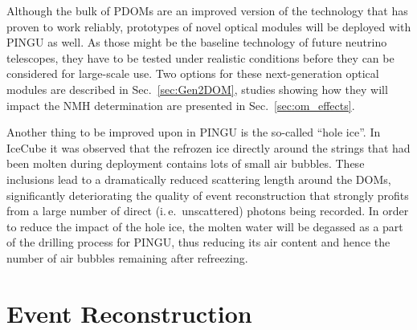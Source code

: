 Although the bulk of PDOMs are an improved version of the technology that has 
proven to work reliably, prototypes of novel optical modules will be deployed 
with PINGU as well. As those might be the baseline technology of future 
neutrino telescopes, they have to be tested under realistic conditions before 
they can be considered for large-scale use. Two options for these 
next-generation optical modules are described in Sec.~\ref{sec:Gen2DOM}, 
studies showing how they will impact the NMH determination are presented in 
Sec.~\ref{sec:om_effects}.

Another thing to be improved upon in PINGU is the so-called ``hole ice''. In 
IceCube it was observed that the refrozen ice directly around the strings that 
had been molten during deployment contains lots of small air bubbles. These 
inclusions lead to a dramatically reduced scattering length around the DOMs,
significantly deteriorating the quality of event reconstruction that strongly
profits from a large number of direct (i.\,e.\ unscattered) photons being
recorded. In order to reduce the impact of the hole ice, the molten water will
be degassed as a part of the drilling process for PINGU, thus reducing its air
content and hence the number of air bubbles remaining after refreezing.

\section{Event Reconstruction}
\label{sec:EvtReco}

